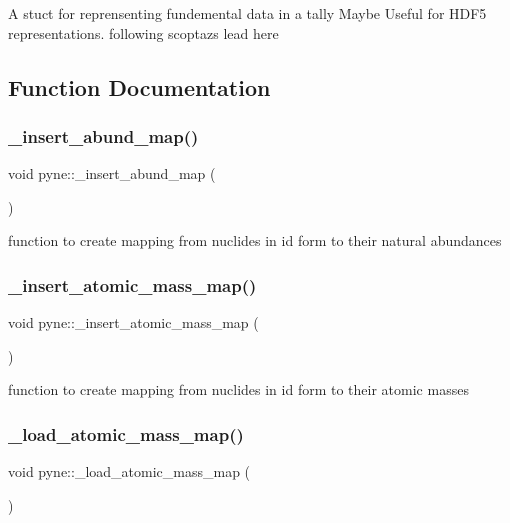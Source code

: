 A stuct for reprensenting fundemental data in a tally Maybe Useful for H\+D\+F5 representations. following scoptaz\textquotesingle{}s lead here 

\subsection{Function Documentation}
\mbox{\label{namespacepyne_a6acc3972fa6eeb9761f4c858af078529}} 
\subsubsection{\texorpdfstring{\+\_\+insert\+\_\+abund\+\_\+map()}{\_insert\_abund\_map()}}
{\footnotesize\ttfamily void pyne\+::\+\_\+insert\+\_\+abund\+\_\+map (\begin{DoxyParamCaption}{ }\end{DoxyParamCaption})}

function to create mapping from nuclides in id form to their natural abundances \mbox{\label{namespacepyne_a7deefcb42d075c174f1cf4f196246cce}} 
\subsubsection{\texorpdfstring{\+\_\+insert\+\_\+atomic\+\_\+mass\+\_\+map()}{\_insert\_atomic\_mass\_map()}}
{\footnotesize\ttfamily void pyne\+::\+\_\+insert\+\_\+atomic\+\_\+mass\+\_\+map (\begin{DoxyParamCaption}{ }\end{DoxyParamCaption})}

function to create mapping from nuclides in id form to their atomic masses \mbox{\label{namespacepyne_afc84ecca5a23b416bd3bf42b0756e68e}} 
\subsubsection{\texorpdfstring{\+\_\+load\+\_\+atomic\+\_\+mass\+\_\+map()}{\_load\_atomic\_mass\_map()}}
{\footnotesize\ttfamily void pyne\+::\+\_\+load\+\_\+atomic\+\_\+mass\+\_\+map (\begin{DoxyParamCaption}{ }\end{DoxyParamCaption})}

